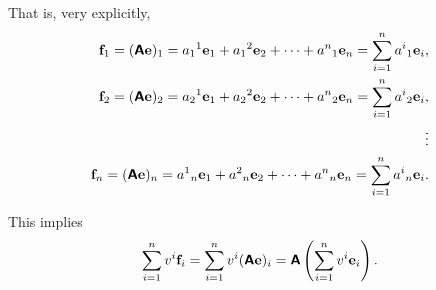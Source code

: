That is, very explicitly,
\begin{equation}
\begin{split}
{\bf f}_1=
(\textsf{\textbf{A}}{\bf e})_1
=
{a_1}^1 {\bf e}_1 +{a_1}^2 {\bf e}_2+\cdots +{a^n}_{1} {\bf e}_n    = \sum_{i=1}^n {a^i}_{1}{\bf e}_i,\\
{\bf f}_2=
(\textsf{\textbf{A}}{\bf e})_2
=
{a_2}^1 {\bf e}_1 +{a_2}^2 {\bf e}_2+\cdots +{a^n}_{2} {\bf e}_n    = \sum_{i=1}^n {a^i}_{2}{\bf e}_i,\\
 \vdots \\
{\bf f}_n=
(\textsf{\textbf{A}}{\bf e})_n
= {a^1}_{n} {\bf e}_1 +{a^2}_{n} {\bf e}_2+\cdots +{a^n}_{n} {\bf e}_n    = \sum_{i=1}^n {a^i}_{n}{\bf e}_i.
\end{split}
\label{2011-m-btbe-eigen}
\end{equation}

This implies
\begin{equation}
\sum_{i=1}^n v^i {\bf f}_i= \sum_{i=1}^n v^i (\textsf{\textbf{A}}{\bf e})_i
= \textsf{\textbf{A}} \left(\sum_{i=1}^n v^i{\bf e}_i\right)
.
\label{2011-m-btbe-2-implied}
\end{equation}

